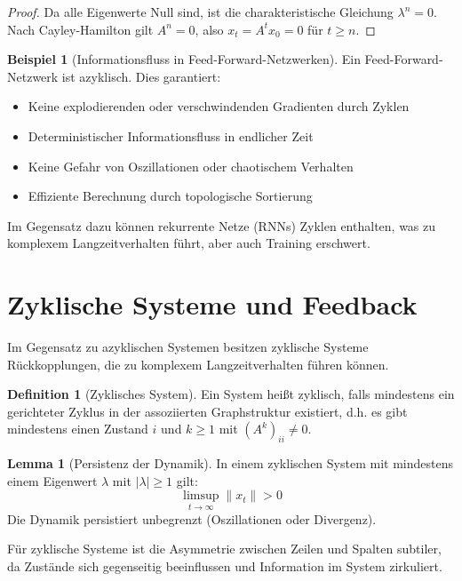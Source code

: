 ﻿\documentclass[a4paper,12pt]{report}
\theoremstyle{definition}
\newtheorem{definition}{Definition}
\newtheorem{beispiel}{Beispiel}
\newtheorem{lemma}{Lemma}
\begin{document}
	\begin{proof}
		Da alle Eigenwerte Null sind, ist die charakteristische Gleichung $\lambda^n = 0$. Nach Cayley-Hamilton gilt $A^n = 0$, also $x_t = A^t x_0 = 0$ für $t \geq n$.
	\end{proof}
	
	\begin{beispiel}[Informationsfluss in Feed-Forward-Netzwerken]
		Ein Feed-Forward-Netzwerk ist azyklisch. Dies garantiert:
		\begin{itemize}
			\item Keine explodierenden oder verschwindenden Gradienten durch Zyklen
			\item Deterministischer Informationsfluss in endlicher Zeit
			\item Keine Gefahr von Oszillationen oder chaotischem Verhalten
			\item Effiziente Berechnung durch topologische Sortierung
		\end{itemize}
		
		Im Gegensatz dazu können rekurrente Netze (RNNs) Zyklen enthalten, was zu komplexem Langzeitverhalten führt, aber auch Training erschwert.
	\end{beispiel}
	
	\section{Zyklische Systeme und Feedback}
	
	Im Gegensatz zu azyklischen Systemen besitzen zyklische Systeme Rückkopplungen, die zu komplexem Langzeitverhalten führen können.
	
	\begin{definition}[Zyklisches System]
		Ein System heißt zyklisch, falls mindestens ein gerichteter Zyklus in der assoziierten Graphstruktur existiert, d.h. es gibt mindestens einen Zustand $i$ und $k \geq 1$ mit $(A^k)_{ii} \neq 0$.
	\end{definition}
	
	\begin{lemma}[Persistenz der Dynamik]
		In einem zyklischen System mit mindestens einem Eigenwert $\lambda$ mit $|\lambda| \geq 1$ gilt:
		\[
		\limsup_{t \to \infty} \|x_t\| > 0
		\]
		Die Dynamik persistiert unbegrenzt (Oszillationen oder Divergenz).
	\end{lemma}
	
	Für zyklische Systeme ist die Asymmetrie zwischen Zeilen und Spalten subtiler, da Zustände sich gegenseitig beeinflussen und Information im System zirkuliert.
	
\end{document}
